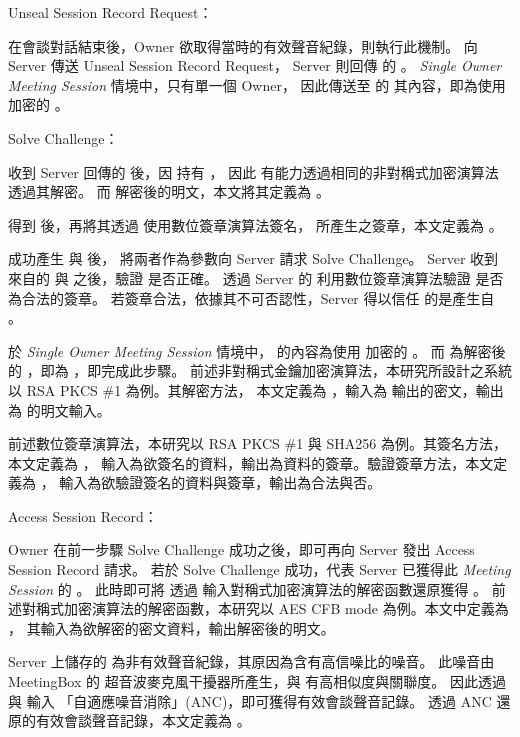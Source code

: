 \begin{steps}
    \item Unseal Session Record Request：

            在會談對話結束後，Owner 欲取得當時的有效聲音紀錄，則執行此機制。
        \DEFowner 向 Server 傳送 Unseal Session Record Request，
        Server 則回傳 \DEFowner 的 \DEFakEnc。
        {\it Single Owner Meeting Session} 情境中，只有單一個 Owner，
        因此傳送至 \DEFowner 的 \DEFakEnc 其內容，即為使用 \DEFfuncEncPK 加密的 \DEFunsealKey。

    \item Solve Challenge：

            \DEFowner 收到 Server 回傳的 \DEFakEnc 後，因 \DEFowner 持有 \DEFprivateKey，
        因此 \DEFowner 有能力透過相同的非對稱式加密演算法透過其解密。
        而 \DEFakEnc 解密後的明文，本文將其定義為 \DEFakEncDec。

            得到 \DEFakEncDec 後，\DEFowner 再將其透過 \DEFprivateKey 使用數位簽章演算法簽名，
        所產生之簽章，本文定義為 \DEFakEncDecSig。

            \DEFowner 成功產生 \DEFakEncDec 與 \DEFakEncDecSig 後，
        將兩者作為參數向 Server 請求 Solve Challenge。
        Server 收到來自\DEFowner 的 \DEFakEncDec 與 \DEFakEncDecSig 之後，驗證 \DEFakEncDecSig 是否正確。
        透過 Server 的 \DEFpublicKey 利用數位簽章演算法驗證 \DEFakEncDecSig 是否為合法的簽章。
        若簽章合法，依據其不可否認性，Server 得以信任 \DEFakEncDec 的是產生自 \DEFowner。

            於 {\it Single Owner Meeting Session} 情境中，
        \DEFakEnc 的內容為使用 \DEFfuncEncPK 加密的 \DEFunsealKey。
        而 \DEFakEncDec 為解密後的 \DEFakEnc ，即為 \DEFunsealKey，即完成此步驟。
        前述非對稱式金鑰加密演算法，本研究所設計之系統以 RSA PKCS \#1 為例。其解密方法，
        本文定義為 \DEFfuncDecSK，輸入為 \DEFfuncEncPK 輸出的密文，輸出為 \DEFfuncEncPK 的明文輸入。

            前述數位簽章演算法，本研究以 RSA PKCS \#1 與 SHA256 為例。其簽名方法，本文定義為 \DEFfuncSignSK，
        輸入為欲簽名的資料，輸出為資料的簽章。驗證簽章方法，本文定義為 \DEFfuncVerfPK，
        輸入為欲驗證簽名的資料與簽章，輸出為合法與否。

    \item Access Session Record：

            Owner 在前一步驟 Solve Challenge 成功之後，即可再向 Server 發出 Access Session Record 請求。
        若於 Solve Challenge 成功，代表 Server 已獲得此 {\it Meeting Session} 的 \DEFunsealKey。
        此時即可將 \DEFrecN 透過 \DEFunsealKey 輸入對稱式加密演算法的解密函數還原獲得 \DEFrecN。
        前述對稱式加密演算法的解密函數，本研究以 AES CFB mode 為例。本文中定義為 \DEFfuncDecEK，
        其輸入為欲解密的密文資料，輸出解密後的明文。

            Server 上儲存的 \DEFrecJ 為非有效聲音紀錄，其原因為含有高信噪比的噪音。
        此噪音由 MeetingBox 的 超音波麥克風干擾器所產生，與 \DEFrecN 有高相似度與關聯度。
        因此透過 \DEFrecN 與 \DEFrecJ 輸入 「自適應噪音消除」(ANC)，即可獲得有效會談聲音記錄。
        透過 ANC 還原的有效會談聲音記錄，本文定義為 \DEFrecREV。
\end{steps}



